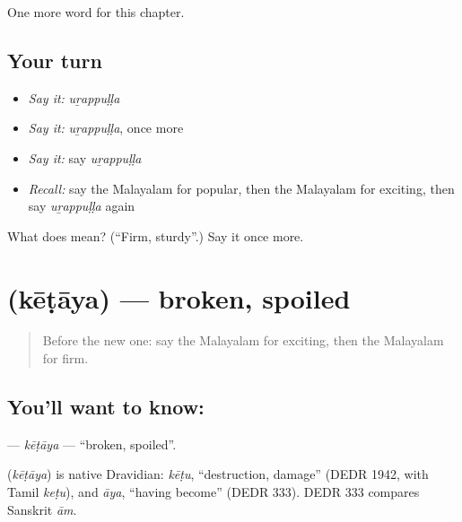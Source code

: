 \begin{grammarlens}[title={What you've built}]
One more word for this chapter.
\end{grammarlens}

\subsection*{Your turn}
\begin{itemize}
\raggedright
  \item \emph{Say it:} \emph{uṟappuḷḷa}
  \item \emph{Say it:} \emph{uṟappuḷḷa}, once more
  \item \emph{Say it:} say \emph{uṟappuḷḷa}
  \item \emph{Recall:} say the Malayalam for popular, then the Malayalam for exciting, then say \emph{uṟappuḷḷa} again
\end{itemize}

\begin{tcolorbox}[breakable,colback=teal!4,colframe=teal!35!black,title={Before you move on}]
What does  mean? (\textquotedblleft{}Firm, sturdy\textquotedblright{}.) Say it once more.
\end{tcolorbox}
\section[\texorpdfstring{\ml{കേടായ} (kēṭāya)}{കേടായ (kēṭāya)}]{ (kēṭāya) — broken, spoiled}

\label{lesson:ML-C246-ketaya}



\begin{quote}
Before the new one: say the Malayalam for exciting, then the Malayalam for firm.
\end{quote}

\subsection*{You'll want to know: }
\textbf{} — \emph{kēṭāya} — \textquotedblleft{}broken, spoiled\textquotedblright{}.

\begin{cousinweb}
\textbf{} (\emph{kēṭāya}) is native Dravidian: \emph{kēṭu}, \textquotedblleft{}destruction, damage\textquotedblright{} (DEDR 1942, with Tamil \emph{keṭu}), and \emph{āya}, \textquotedblleft{}having become\textquotedblright{} (DEDR 333). DEDR 333 compares Sanskrit \emph{ām}.
\end{cousinweb}

